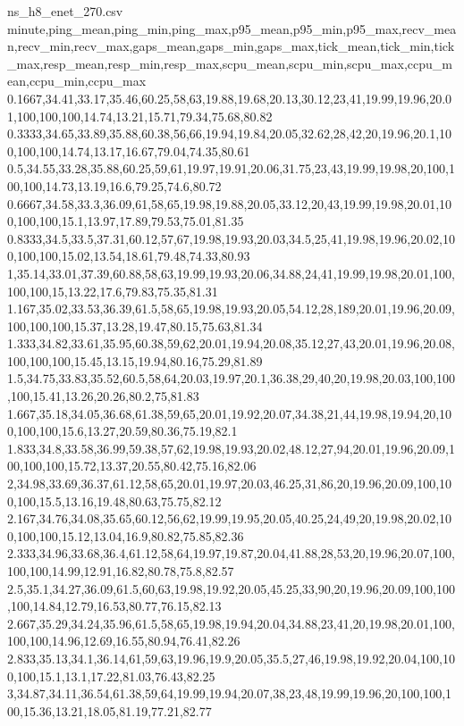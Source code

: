 \begin{filecontents*}[overwrite]{ns_h8_enet_270.csv}
minute,ping_mean,ping_min,ping_max,p95_mean,p95_min,p95_max,recv_mean,recv_min,recv_max,gaps_mean,gaps_min,gaps_max,tick_mean,tick_min,tick_max,resp_mean,resp_min,resp_max,scpu_mean,scpu_min,scpu_max,ccpu_mean,ccpu_min,ccpu_max
0.1667,34.41,33.17,35.46,60.25,58,63,19.88,19.68,20.13,30.12,23,41,19.99,19.96,20.01,100,100,100,14.74,13.21,15.71,79.34,75.68,80.82
0.3333,34.65,33.89,35.88,60.38,56,66,19.94,19.84,20.05,32.62,28,42,20,19.96,20.1,100,100,100,14.74,13.17,16.67,79.04,74.35,80.61
0.5,34.55,33.28,35.88,60.25,59,61,19.97,19.91,20.06,31.75,23,43,19.99,19.98,20,100,100,100,14.73,13.19,16.6,79.25,74.6,80.72
0.6667,34.58,33.3,36.09,61,58,65,19.98,19.88,20.05,33.12,20,43,19.99,19.98,20.01,100,100,100,15.1,13.97,17.89,79.53,75.01,81.35
0.8333,34.5,33.5,37.31,60.12,57,67,19.98,19.93,20.03,34.5,25,41,19.98,19.96,20.02,100,100,100,15.02,13.54,18.61,79.48,74.33,80.93
1,35.14,33.01,37.39,60.88,58,63,19.99,19.93,20.06,34.88,24,41,19.99,19.98,20.01,100,100,100,15,13.22,17.6,79.83,75.35,81.31
1.167,35.02,33.53,36.39,61.5,58,65,19.98,19.93,20.05,54.12,28,189,20.01,19.96,20.09,100,100,100,15.37,13.28,19.47,80.15,75.63,81.34
1.333,34.82,33.61,35.95,60.38,59,62,20.01,19.94,20.08,35.12,27,43,20.01,19.96,20.08,100,100,100,15.45,13.15,19.94,80.16,75.29,81.89
1.5,34.75,33.83,35.52,60.5,58,64,20.03,19.97,20.1,36.38,29,40,20,19.98,20.03,100,100,100,15.41,13.26,20.26,80.2,75,81.83
1.667,35.18,34.05,36.68,61.38,59,65,20.01,19.92,20.07,34.38,21,44,19.98,19.94,20,100,100,100,15.6,13.27,20.59,80.36,75.19,82.1
1.833,34.8,33.58,36.99,59.38,57,62,19.98,19.93,20.02,48.12,27,94,20.01,19.96,20.09,100,100,100,15.72,13.37,20.55,80.42,75.16,82.06
2,34.98,33.69,36.37,61.12,58,65,20.01,19.97,20.03,46.25,31,86,20,19.96,20.09,100,100,100,15.5,13.16,19.48,80.63,75.75,82.12
2.167,34.76,34.08,35.65,60.12,56,62,19.99,19.95,20.05,40.25,24,49,20,19.98,20.02,100,100,100,15.12,13.04,16.9,80.82,75.85,82.36
2.333,34.96,33.68,36.4,61.12,58,64,19.97,19.87,20.04,41.88,28,53,20,19.96,20.07,100,100,100,14.99,12.91,16.82,80.78,75.8,82.57
2.5,35.1,34.27,36.09,61.5,60,63,19.98,19.92,20.05,45.25,33,90,20,19.96,20.09,100,100,100,14.84,12.79,16.53,80.77,76.15,82.13
2.667,35.29,34.24,35.96,61.5,58,65,19.98,19.94,20.04,34.88,23,41,20,19.98,20.01,100,100,100,14.96,12.69,16.55,80.94,76.41,82.26
2.833,35.13,34.1,36.14,61,59,63,19.96,19.9,20.05,35.5,27,46,19.98,19.92,20.04,100,100,100,15.1,13.1,17.22,81.03,76.43,82.25
3,34.87,34.11,36.54,61.38,59,64,19.99,19.94,20.07,38,23,48,19.99,19.96,20,100,100,100,15.36,13.21,18.05,81.19,77.21,82.77

\end{filecontents*}
